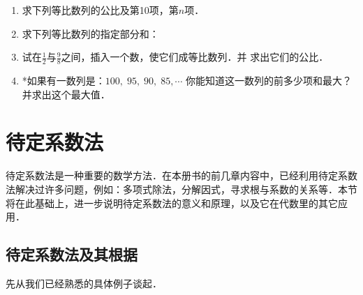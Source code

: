 \begin{enumerate}
\begin{enumerate}
\end{enumerate}

\item  求下列等比数列的公比及第10项，第$n$项．
\begin{enumerate}
\end{enumerate}

\item  求下列等比数列的指定部分和：
\begin{enumerate}
\end{enumerate}

\item  试在$\frac{1}{2}$与$\frac{9}{8}$之间，插入一个数，使它们成等比数列．并
求出它们的公比．

\item *如果有一数列是：$100,\; 95,\; 90,\; 85,\cdots$
你能知道这一数列的前多少项和最大？并求出这个最大值．

\end{enumerate}

\section{待定系数法}
待定系数法是一种重要的数学方法．在本册书的前几章内容中，已经利用待定系数法解决过许多问题，例如：多项式除法，分解因式，寻求根与系数的关系等．本节将在此基础上，进一步说明待定系数法的意义和原理，以及它在代数里的其它应用．

\subsection{待定系数法及其根据}
先从我们已经熟悉的具体例子谈起．


